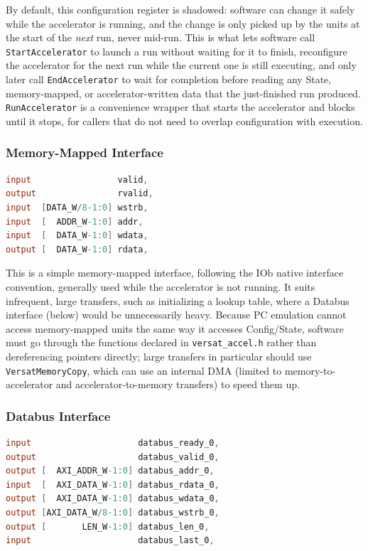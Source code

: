 By default, this configuration register is shadowed: software can change
it safely while the accelerator is running, and the change is only picked
up by the units at the start of the \emph{next} run, never mid-run. This is
what lets software call \texttt{StartAccelerator} to launch a run without
waiting for it to finish, reconfigure the accelerator for the next run
while the current one is still executing, and only later call
\texttt{EndAccelerator} to wait for completion before reading any State,
memory-mapped, or accelerator-written data that the just-finished run
produced. \texttt{RunAccelerator} is a convenience wrapper that starts the
accelerator and blocks until it stops, for callers that do not need to
overlap configuration with execution.

\subsubsection*{Memory-Mapped Interface}
\label{sec:if_mem_mapped}

\begin{lstlisting}[language=Verilog,caption={Memory-mapped interface, following the IOb native interface convention.},label={lst:if_mem_mapped}]
input                 valid,
output                rvalid,
input  [DATA_W/8-1:0] wstrb,
input  [  ADDR_W-1:0] addr,
input  [  DATA_W-1:0] wdata,
output [  DATA_W-1:0] rdata,
\end{lstlisting}

This is a simple memory-mapped interface, following the IOb native
interface convention, generally used while the accelerator is not
running. It suits infrequent, large transfers, such as initializing a
lookup table, where a Databus interface (below) would be unnecessarily
heavy. Because PC emulation cannot access memory-mapped units the same way
it accesses Config/State, software must go through the functions declared
in \texttt{versat\_accel.h} rather than dereferencing pointers directly;
large transfers in particular should use \texttt{VersatMemoryCopy}, which
can use an internal DMA (limited to memory-to-accelerator and
accelerator-to-memory transfers) to speed them up.

\subsubsection*{Databus Interface}
\label{sec:if_databus}

\begin{lstlisting}[language=Verilog,caption={Databus interface, indexed per instance (here, index 0).},label={lst:if_databus}]
input                     databus_ready_0,
output                    databus_valid_0,
output [  AXI_ADDR_W-1:0] databus_addr_0,
input  [  AXI_DATA_W-1:0] databus_rdata_0,
output [  AXI_DATA_W-1:0] databus_wdata_0,
output [AXI_DATA_W/8-1:0] databus_wstrb_0,
output [       LEN_W-1:0] databus_len_0,
input                     databus_last_0,
\end{lstlisting}

